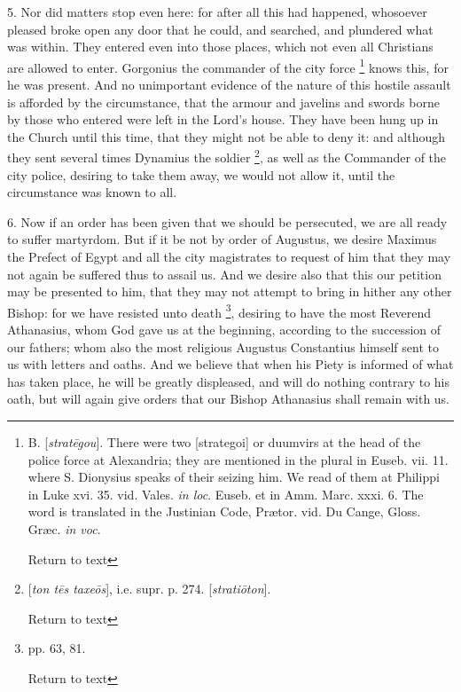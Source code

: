 5. Nor did matters stop even here: for after all
this had happened, whosoever pleased broke open any door that he
could, and searched, and plundered what was within. They entered even
into those places, which not even all Christians are allowed to enter.
Gorgonius the commander of the city force \footnote{B. [\emph{strat\={e}gou}]. There were two [strategoi]
or duumvirs at the head of the police force at Alexandria; they are
mentioned in the plural in Euseb. vii. 11. where S. Dionysius speaks
of their seizing him. We read of them at Philippi in Luke xvi. 35.
vid. Vales. \emph{in loc}. Euseb. et in Amm. Marc. xxxi. 6. The word
is translated in the Justinian Code, Prætor. vid. Du Cange, Gloss. Græc.
\emph{in voc}.

Return to text} knows this, for he was
present. And no unimportant evidence of the nature of this hostile
assault is afforded by the circumstance, that the armour and javelins
and swords borne by those who entered were left in the Lord's house.
They have been hung up in the Church until this time, that they might
not be able to deny it: and although they sent several times Dynamius
the soldier \footnote{[\emph{ton t\={e}s taxe\={o}s}], i.e.
supr. p. 274. [\emph{strati\={o}ton}].

Return to text}, as well as the Commander of the city police,
desiring to take them away, we would not allow it, until the
circumstance was known to all.

6. Now if an order has been given that we should
be persecuted, we are all ready to suffer martyrdom. But if it be not
by order of Augustus, we desire Maximus the Prefect of Egypt and all
the city magistrates to request of him that they may not again be
suffered thus to assail us. And we desire also that this our petition
may be presented to him, that they may not attempt to bring in hither
any other Bishop: for we have resisted unto death \footnote{pp. 63, 81.

Return to text}, desiring
to have the most Reverend Athanasius, whom God gave us at the
beginning, according to the succession of our fathers; whom also the
most religious Augustus Constantius himself sent to us with letters
and oaths. And we believe that when his Piety is informed of what has
taken place, he will be greatly displeased, and will do nothing
contrary to his oath, but will again give orders that our Bishop
Athanasius shall remain with us.

